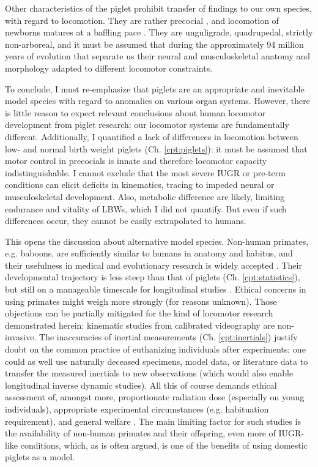 Other characteristics of the piglet prohibit transfer of findings to our own species, with regard to locomotion.
They are rather precocial \citep{Wischner2009,JYoung2023}, and locomotion of newborns matures at a baffling pace \citep{VandenHole2017,VandenHole2018}.
They are unguligrade, quadrupedal, strictly non-arboreal, and it must be assumed that during the approximately 94 million years of evolution that separate us \citep{Timetree2017} their neural and musculoskeletal anatomy and morphology adapted to different locomotor constraints.


To conclude, I must re-emphasize that piglets are an appropriate and inevitable model species with regard to anomalies on various organ systems.
However, there is little reason to expect relevant conclusions about human locomotor development from piglet research: our locomotor systems are fundamentally different.
Additionally, I quantified a lack of differences in locomotion between low- and normal birth weight piglets (Ch. \ref{cpt:piglets}): it must be assumed that motor control in precocials is innate and therefore locomotor capacity indistinguishable.
I cannot exclude that the most severe IUGR or pre-term conditions can elicit deficits in kinematics, tracing to impeded neural or musculoskeletal development.
Also, metabolic difference are likely, limiting endurance and vitality of LBWs, which I did not quantify.
But even if such differences occur, they cannot be easily extrapolated to humans.


This opens the discussion about alternative model species.
Non-human primates, e.g. baboons, are sufficiently similar to humans in anatomy and habitus, and their usefulness in medical and evolutionary research is widely accepted \citep{Nardone2017,Liang2023,Aerts2023b,Druelle2021,BoulinguezAmbroise2021}.
Their developmental trajectory is less steep than that of piglets (Ch. \ref{cpt:statistics}), but still on a manageable timescale for longitudinal studies \citep{Druelle2017}.
Ethical concerns in using primates might weigh more strongly (for reasons unknown).
Those objections can be partially mitigated for the kind of locomotor research demonstrated herein:
kinematic studies from calibrated videography are non-invasive.
The inaccuracies of inertial measurements (Ch. \ref{cpt:inertials}) justify doubt on the common practice of euthanizing individuals after experiments; one could as well use naturally deceased specimens, model data, or literature data to transfer the measured inertials to new observations (which would also enable longitudinal inverse dynamic studies).
All this of course demands ethical assessment of, amongst more, proportionate radiation dose (especially on young individuals), appropriate experimental circumstances (e.g. habituation requirement), and general welfare \citep{Young2018}.
The main limiting factor for such studies is the availability of non-human primates and their offspring, even more of IUGR-like conditions, which, as is often argued, is one of the benefits of using domestic piglets as a model.

